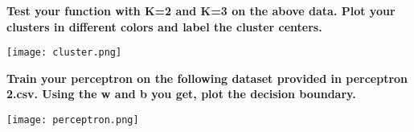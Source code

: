 \documentclass{exam}
\begin{document}
\begin{questions}
\question\textbf{Test your function with K=2 and K=3 on the above data. Plot your clusters in different colors and label the cluster centers.}
\par\normalfont 
\begin{wrapfigure}
    \centering
    \texttt{[image: cluster.png]}
\end{wrapfigure}

\question\textbf{Train your perceptron on the following dataset provided in perceptron 2.csv. Using the w and b you get, plot the decision boundary.}
\par\normalfont 
\begin{wrapfigure}
    \centering
    \texttt{[image: perceptron.png]}
\end{wrapfigure}

\end{questions}
\clearpage
\end{document}
